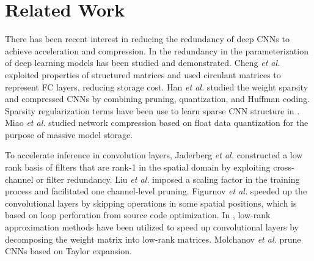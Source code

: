 \documentclass[10pt,twocolumn,letterpaper]{article}
\begin{document}
\section{Related Work}%
There has been recent interest in reducing the redundancy of deep CNNs to achieve acceleration and compression. 
In \cite{PredictingParameters} the redundancy in the parameterization of deep learning models has been studied and demonstrated.
Cheng \emph{et al.}\cite{Circulant} exploited properties of structured matrices and used circulant matrices to represent FC layers, reducing storage cost. 
Han \emph{et al.}\cite{DeepCompress} studied the weight sparsity and compressed CNNs by combining pruning, quantization, and Huffman coding. Sparsity regularization terms have been use to learn sparse CNN structure in \cite{lasso,SSL,learning}. Miao \emph{et al.}\cite{miao-icde} studied network compression based on float data quantization for the purpose of massive model storage.

To accelerate inference in convolution layers, Jaderberg \emph{et al.}\cite{SeperableFilter} constructed a low rank basis of filters that are rank-1 in the spatial domain by exploiting cross-channel or filter redundancy.
Liu \emph{et al.}\cite{slimLiu} imposed a scaling factor in the training process and facilitated one channel-level pruning.
Figurnov \emph{et al.}\cite{PerforatedCNN} speeded up the convolutional layers by skipping operations in some spatial positions, which is based on loop perforation from source code optimization.
In \cite{DentonLeCun,Nonlinear,Tucker}, low-rank approximation methods have been utilized to speed up convolutional layers by decomposing the weight matrix into low-rank matrices. 
Molchanov \emph{et al.}\cite{Nvidia} prune CNNs based on Taylor expansion.
\end{document}
